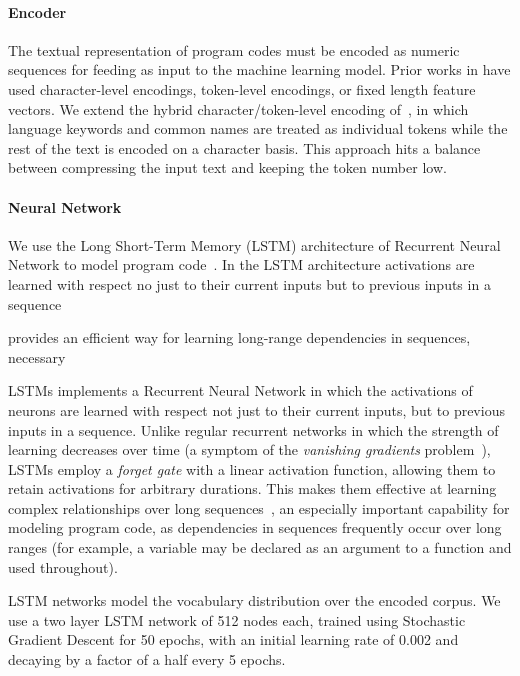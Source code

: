 \paragraph{Encoder} The textual representation of program codes must be encoded as numeric sequences for feeding as input to the machine learning model. Prior works in have used character-level encodings, token-level encodings, or fixed length feature vectors. We extend the hybrid character/token-level encoding of~\cite{Cummins2017b}, in which language keywords and common names are treated as individual tokens while the rest of the text is encoded on a character basis. This approach hits a balance between compressing the input text and keeping the token number low. 

\paragraph{Neural Network} We use the Long Short-Term Memory (LSTM) architecture of Recurrent Neural Network to model program code~\cite{Hochreiter1997}. In the LSTM architecture activations are learned with respect no just to their current inputs but to previous inputs in a sequence 


provides an efficient way for learning long-range dependencies in sequences, necessary 

LSTMs implements a Recurrent Neural Network in which the activations of neurons are learned with respect not just to their current inputs, but to previous inputs in a sequence. Unlike regular recurrent networks in which the strength of learning decreases over time (a symptom of the \emph{vanishing gradients} problem~\cite{Pacanu2013}), LSTMs employ a \emph{forget gate} with a linear activation function, allowing them to retain activations for arbitrary durations. This makes them effective at learning complex relationships over long sequences~\cite{Lipton2015}, an especially important capability for modeling program code, as dependencies in sequences frequently occur over long ranges (for example, a variable may be declared as an argument to a function and used throughout).


LSTM networks model the vocabulary distribution over the encoded corpus. We use a two layer LSTM network of 512 nodes each, trained using Stochastic Gradient Descent for 50 epochs, with an initial learning rate of 0.002 and decaying by a factor of a half every 5 epochs. %

